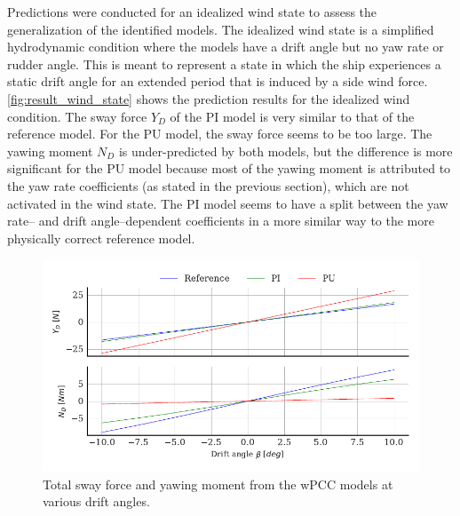 Predictions were conducted for an idealized wind state to assess the generalization of the identified models. The idealized wind state is a simplified hydrodynamic condition where the models have a drift angle but no yaw rate or rudder angle. This is meant to represent a state in which the ship experiences a static drift angle for an extended period that is induced by a side wind force.
\autoref{fig:result_wind_state} shows the prediction results for the idealized wind condition. The sway force $Y_D$ of the PI model is very similar to that of the reference model. For the PU model, the sway force seems to be too large. The yawing moment $N_D$ is under-predicted by both models, but the difference is more significant for the PU model because most of the yawing moment is attributed to the yaw rate coefficients (as stated in the previous section), which are not activated in the wind state. 
The PI model seems to have a split between the yaw rate-- and drift angle--dependent coefficients in a more similar way to the more physically correct reference model.
\label{sec:wind_state}
\begin{figure}[h!]
    \includegraphics{figures/result_wind_state.forces.pdf}
    \caption{Total sway force and yawing moment from the wPCC models at various drift angles.}
    \label{fig:result_wind_state}
\end{figure}